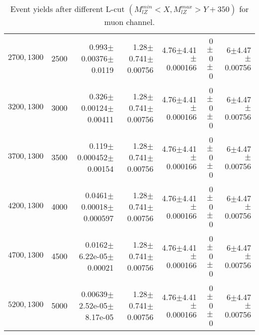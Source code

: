 \documentclass[]{article}
\begin{document}
\begin{table}
\begin{center}
{\begin{tabular}{ |r|r|r|r|r|r|r|}
$2700,1300$ & 2500 & 0.993$\pm$0.00376$\pm$0.0119 & 1.28$\pm$0.741$\pm$0.00756 & 4.76$\pm$4.41$\pm$0.000166 & 0$\pm$0$\pm$0 & 6$\pm$4.47$\pm$0.00756 \\
$3200,1300$ & 3000 & 0.326$\pm$0.00124$\pm$0.00411 & 1.28$\pm$0.741$\pm$0.00756 & 4.76$\pm$4.41$\pm$0.000166 & 0$\pm$0$\pm$0 & 6$\pm$4.47$\pm$0.00756 \\
$3700,1300$ & 3500 & 0.119$\pm$0.000452$\pm$0.00154 & 1.28$\pm$0.741$\pm$0.00756 & 4.76$\pm$4.41$\pm$0.000166 & 0$\pm$0$\pm$0 & 6$\pm$4.47$\pm$0.00756 \\
$4200,1300$ & 4000 & 0.0461$\pm$0.00018$\pm$0.000597 & 1.28$\pm$0.741$\pm$0.00756 & 4.76$\pm$4.41$\pm$0.000166 & 0$\pm$0$\pm$0 & 6$\pm$4.47$\pm$0.00756 \\
$4700,1300$ & 4500 & 0.0162$\pm$6.22e-05$\pm$0.00021 & 1.28$\pm$0.741$\pm$0.00756 & 4.76$\pm$4.41$\pm$0.000166 & 0$\pm$0$\pm$0 & 6$\pm$4.47$\pm$0.00756 \\
$5200,1300$ & 5000 & 0.00639$\pm$2.52e-05$\pm$8.17e-05 & 1.28$\pm$0.741$\pm$0.00756 & 4.76$\pm$4.41$\pm$0.000166 & 0$\pm$0$\pm$0 & 6$\pm$4.47$\pm$0.00756 \\
\hline 
\end{tabular}
}
\end{center}
\caption{Event yields after different L-cut $(M_{lZ}^{min} < X, M_{lZ}^{max} > Y + 350)$ for muon channel.}
\end{table}
\end{document}

